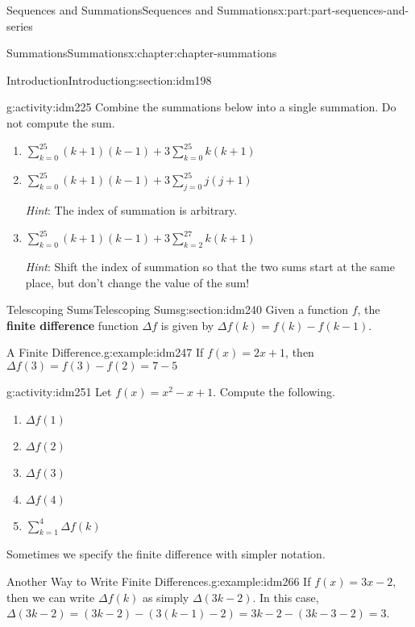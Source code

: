 \documentclass[oneside,10pt,]{book}
\newcommand{\terminology}[1]{\textbf{#1}}
\numberwithin{equation}{section}
\begin{document}
\begin{partptx}{Sequences and Summations}{}{Sequences and Summations}{}{}{x:part:part-sequences-and-series}
\begin{chapterptx}{Summations}{}{Summations}{}{}{x:chapter:chapter-summations}
\begin{sectionptx}{Introduction}{}{Introduction}{}{}{g:section:idm198}
\begin{activity}{}{g:activity:idm225}
Combine the summations below into a single summation. Do not compute the sum.%
\begin{enumerate}[font=\bfseries,label=(\alph*),ref=\alph*]
\item{}\(\displaystyle\sum_{k=0}^{25} (k+1)(k-1) + 3\sum_{k=0}^{25} k(k+1)\)\item{}\(\displaystyle\sum_{k=0}^{25} (k+1)(k-1) + 3\sum_{j=0}^{25} j(j+1)\)%
\par
\emph{Hint}: The index of summation is arbitrary.%
\item{}\(\displaystyle\sum_{k=0}^{25} (k+1)(k-1) + 3\sum_{k=2}^{27} k(k+1)\)%
\par
\emph{Hint}: Shift the index of summation so that the two sums start at the same place, but don't change the value of the sum!%
\end{enumerate}
\end{activity}
\end{sectionptx}
%
%
\typeout{************************************************}
\typeout{************************************************}
%
\begin{sectionptx}{Telescoping Sums}{}{Telescoping Sums}{}{}{g:section:idm240}
Given a function \(f\), the \terminology{finite difference} function \(\Delta f\) is given by \(\Delta f(k) = f(k) - f(k-1)\).%
\begin{example}{A Finite Difference.}{g:example:idm247}%
 If \(f(x) = 2x+1\), then \(\Delta f(3) = f(3) - f(2) = 7-5\)\end{example}
\begin{activity}{}{g:activity:idm251}%
Let \(f(x) = x^2-x+1\). Compute the following.%
\begin{enumerate}[font=\bfseries,label=(\alph*),ref=\alph*]
\item{}\(\Delta f(1)\)\item{}\(\Delta f(2)\)\item{}\(\Delta f(3)\)\item{}\(\Delta f(4)\)\item{}\(\displaystyle\sum_{k=1}^4\Delta f(k)\)\end{enumerate}
\end{activity}
Sometimes we specify the finite difference with simpler notation.%
\begin{example}{Another Way to Write Finite Differences.}{g:example:idm266}%
If \(f(x) = 3x-2\), then we can write \(\Delta f(k)\) as simply \(\Delta (3k-2)\). In this case, \(\Delta (3k-2) = (3k-2) - (3(k-1)-2) = 3k - 2 - (3k - 3 -2) = 3\).%

\end{example}
\end{sectionptx}
\end{chapterptx}
\end{partptx}
\end{document}
